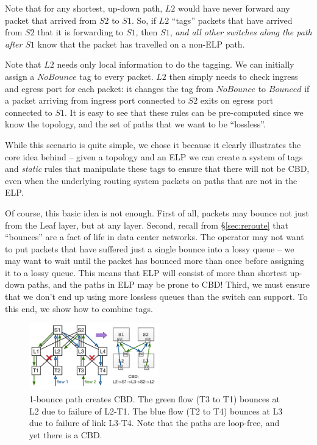 Note that for any shortest, up-down path, $L2$ would have never
forward any packet that arrived from $S2$ to $S1$. So, if $L2$ ``tags'' packets
that have arrived from $S2$ that it is forwarding to $S1$, then $S1$, {\em and
all other switches along the path after $S1$} know that the packet has travelled
on a non-ELP path.

Note that $L2$ needs only local information to do the tagging. We can initially
assign a $NoBounce$ tag to every packet. $L2$ then simply needs to check ingress
and egress port for each packet: it changes the tag from $NoBounce$ to $Bounced$
if a packet arriving from ingress port connected to $S2$ exits on egress port
connected to $S1$.  It is easy to see that these rules can be pre-computed since
we know the topology, and the set of  paths that we want to be ``lossless''.

While this scenario is quite simple, we chose it because it clearly illustrates
the core idea behind \sysname{} -- given a topology and an ELP we can create a
system of tags and {\em static} rules that manipulate these tags to ensure that
there will not be CBD, even when the underlying routing system packets on paths
that are not in the ELP.

Of course, this basic idea is not enough. First of all, packets may bounce not
just from the Leaf layer, but at any layer. Second, recall from
\S\ref{sec:reroute} that ``bounces'' are a fact of life in data center networks.
The operator may not want to put packets that have suffered just a single bounce
into a lossy queue -- we may want to wait until the packet has bounced more than
once before assigning it to a lossy queue. This means that ELP will consist
of more than shortest up-down paths, and the paths in ELP may be prone to CBD!
Third, we must ensure that we don't end up using more lossless queues than the
switch can support. To this end, we show how to combine tags.

\begin{figure}[t]
	\centering
	\includegraphics[width=0.5\textwidth] {figs/cbd_a}
	\vspace{-1em}
		\caption{1-bounce path creates CBD. The green flow (T3 to T1) bounces at L2 due to failure
		of L2-T1. The blue flow (T2 to T4) bounces at L3 due to failure of link
		L3-T4. Note that the paths are loop-free, and yet there is a CBD.}
	\vspace{-1em}
	\label{fig:clos_1_bounce}
\end{figure}

